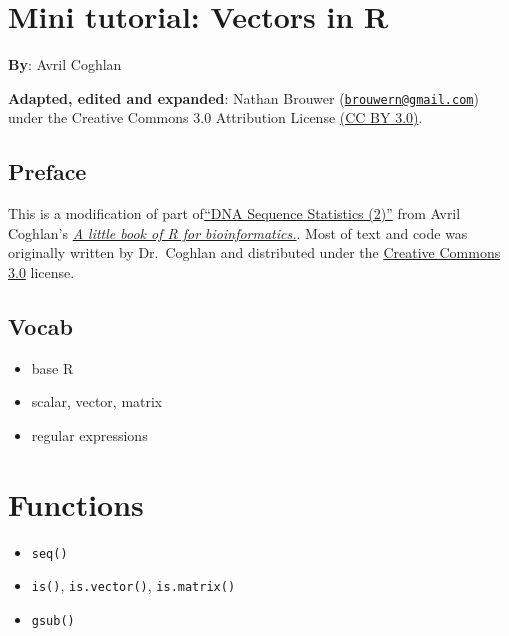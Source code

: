 \documentclass[
]{book}
\providecommand{\tightlist}{%
  \setlength{\itemsep}{0pt}\setlength{\parskip}{0pt}}
\begin{document}
\hypertarget{mini-tutorial-vectors-in-r}{%
\chapter{Mini tutorial: Vectors in R}\label{mini-tutorial-vectors-in-r}}

\textbf{By}: Avril Coghlan

\textbf{Adapted, edited and expanded}: Nathan Brouwer (\href{mailto:brouwern@gmail.com}{\nolinkurl{brouwern@gmail.com}}) under the Creative Commons 3.0 Attribution License \href{https://creativecommons.org/licenses/by/3.0/}{(CC BY 3.0)}.

\hypertarget{preface-4}{%
\section{Preface}\label{preface-4}}

This is a modification of part of\href{https://a-little-book-of-r-for-bioinformatics.readthedocs.io/en/latest/src/chapter2.html}{``DNA Sequence Statistics (2)''} from Avril Coghlan's \href{https://a-little-book-of-r-for-bioinformatics.readthedocs.io/en/latest/index.html}{\emph{A little book of R for bioinformatics.}}. Most of text and code was originally written by Dr.~Coghlan and distributed under the \href{https://creativecommons.org/licenses/by/3.0/us/}{Creative Commons 3.0} license.

\hypertarget{vocab-2}{%
\section{Vocab}\label{vocab-2}}

\begin{itemize}
\tightlist
\item
  base R
\item
  scalar, vector, matrix
\item
  regular expressions
\end{itemize}

\hypertarget{functions-3}{%
\chapter{Functions}\label{functions-3}}

\begin{itemize}
\tightlist
\item
  \texttt{seq()}
\item
  \texttt{is()}, \texttt{is.vector()}, \texttt{is.matrix()}
\item
  \texttt{gsub()}
\end{itemize}
\end{document}
